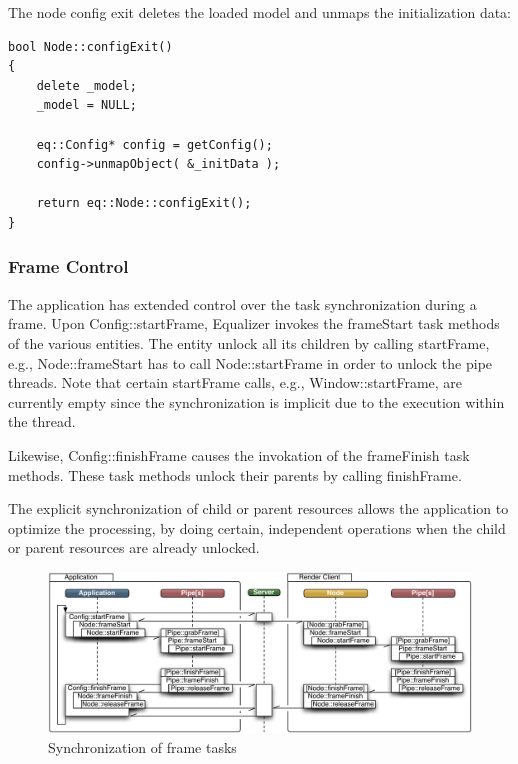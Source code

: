 \documentclass[10pt,a4]{scrartcl}
\begin{document}
The node config exit deletes the loaded model and unmaps the
initialization data: 

{\footnotesize\begin{lstlisting}
bool Node::configExit()
{
    delete _model;
    _model = NULL;

    eq::Config* config = getConfig();
    config->unmapObject( &_initData );

    return eq::Node::configExit();
}
\end{lstlisting}}

\subsubsection{Frame Control}

The application has extended control over the task synchronization
during a frame. Upon \textsf{Config::startFrame}, Equalizer invokes the
\textsf{frameStart} task methods of the various entities. The entity
unlock all its children by calling \textsf{startFrame}, e.g.,
\textsf{Node::frameStart} has to call \textsf{Node::startFrame} in order
to unlock the pipe threads. Note that certain \textsf{startFrame} calls,
e.g., \textsf{Window::startFrame}, are currently empty since the
synchronization is implicit due to the execution within the thread.

Likewise, \textsf{Config::finishFrame} causes the invokation of the
\textsf{frameFinish} task methods. These task methods unlock their
parents by calling \textsf{finishFrame}.

The explicit synchronization of child or parent resources allows the
application to optimize the processing, by doing certain, independent
operations when the child or parent resources are already unlocked.

\begin{figure}[ht!]\center
  \includegraphics[width=.9\textwidth]{images/mainloop.pdf}
  {\caption{\small\label{fFrameSync}Synchronization of frame tasks}}
\end{figure}
\end{document}
